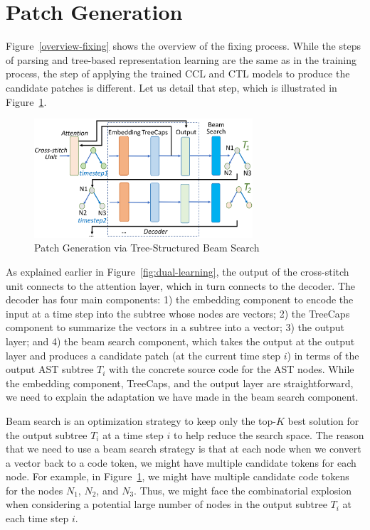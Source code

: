\section{Patch Generation}
\label{sec:patch-gen}

Figure~\ref{overview-fixing} shows the overview of the fixing process.
While the steps of parsing and tree-based representation learning are
the same as in the training process, the step of applying the trained
CCL and CTL models to produce the candidate patches is
different. Let us detail that step, which is illustrated in
Figure~\ref{fig:patch-gen}.

\begin{figure}[t]
	\centering
	\includegraphics[width=3.2in]{graphs/beam-search.png}
	\caption{Patch Generation via Tree-Structured Beam Search}
	\label{fig:patch-gen}
\end{figure}

As explained earlier in Figure~\ref{fig:dual-learning}, the output of the
cross-stitch unit connects to the attention layer, which in turn
connects to the decoder. The decoder has four main components: 1) the
embedding component to encode the input at a time step into the
subtree whose nodes are vectors; 2) the
TreeCaps~\cite{bui2021treecaps} component to summarize the vectors in
a subtree into a vector; 3) the output layer; and 4) the beam search
component, which takes the output at the output layer and produces a
candidate patch (at the current time step $i$) in terms of the output
AST subtree $T_i$ with the concrete source code for the AST
nodes. While the embedding component, TreeCaps, and the output layer
are straightforward, we need to explain the adaptation we have made in
the beam search component.

Beam search is an optimization strategy to keep only the top-$K$ best
solution for the output subtree $T_i$ at a time step $i$ to help
reduce the search space. The reason that we need to use a beam search
strategy is that at each node when we convert a vector back to a code
token, we might have multiple candidate tokens for each node. For
example, in Figure~\ref{fig:patch-gen}, we might have multiple
candidate code tokens for the nodes $N_1$, $N_2$, and $N_3$. Thus, we
might face the combinatorial explosion when considering a potential
large number of nodes in the output subtree $T_i$ at each time step
$i$.

